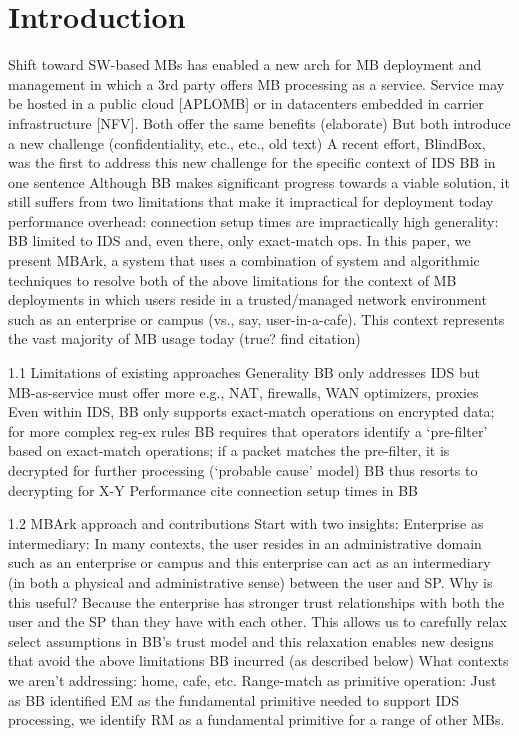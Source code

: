 \section{Introduction}


Shift toward SW-based MBs has enabled a new arch for MB deployment and management in which a 3rd party offers MB processing as a service. 
  Service may be hosted in a public cloud [APLOMB] or in datacenters embedded in carrier infrastructure [NFV]. 
  Both offer the same benefits (elaborate)
But both introduce a new challenge (confidentiality, etc., etc., old text)
  A recent effort, BlindBox, was the first to address this new challenge for the specific context of IDS
  BB in one sentence
  Although BB makes significant progress towards a viable solution, it still suffers from two limitations that make it impractical for deployment today 
  performance overhead: connection setup times are impractically high
  generality: BB limited to IDS and, even there, only exact-match ops.
In this paper, we present MBArk, a system that uses a combination of system and algorithmic techniques to resolve both of the above limitations for the context of MB deployments in which users reside in a trusted/managed network environment such as an enterprise or campus  (vs., say, user-in-a-cafe). This context represents the vast majority of MB usage today (true? find citation)


  1.1 Limitations of existing approaches
  Generality
  BB only addresses IDS but MB-as-service must offer more
  e.g., NAT, firewalls, WAN optimizers, proxies
  Even within IDS, BB only supports exact-match operations on encrypted data; for more complex reg-ex rules BB requires that operators identify a `pre-filter’ based on exact-match operations; if a packet matches the pre-filter, it is decrypted for further processing (`probable cause’ model)
  BB thus resorts to decrypting for X-Y%
  Performance
  cite connection setup times in BB


  1.2 MBArk approach and contributions  
  Start with two insights: 
  Enterprise as intermediary: In many contexts, the user resides in an administrative domain such as an enterprise or campus and this enterprise can act as an intermediary (in both a physical and administrative sense) between the user and SP.
Why is this useful? Because the enterprise has stronger trust relationships with both the user and the SP than they have with each other. This allows us to carefully relax select assumptions in BB’s trust model and this relaxation enables new designs that avoid the above limitations BB incurred (as described below)
  What contexts we aren’t addressing: home, cafe, etc.
  Range-match as primitive operation: Just as BB identified EM as the fundamental primitive needed to support IDS processing, we identify RM as a fundamental primitive for a range of other MBs.


